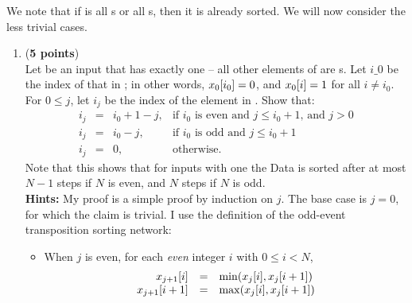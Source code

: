 \documentclass{article}
\newcounter{saveenumii}
\begin{document}
\begin{enumerate}
          We note that if  is all s or all s, then it is already sorted.
          We will now consider the less trivial cases.
          \begin{enumerate}\setcounter{enumii}{\value{saveenumii}}
              \item (\textbf{5 points})\label{q:sort.base}\\
                    Let  be an input that has exactly one  -- all other elements of  are s.
                    Let $i\_0$ be the index of that  in ; in other words, $x_{0}[i_0] = 0$, and
                    $x_{0}[i] = 1$ for all $i \neq i_0$.
                    For $0 \leq j$, let $i_j$ be the index of the  element in .
                    Show that:
                    \begin{displaymath}\begin{array}{rcll}
                            i_j & = & i_0 + 1 - j, & \textrm{if $i_0$ is even and $j \leq i_0 + 1$, and $j > 0$} \\
                            i_j & = & i_0 - j,     & \textrm{if $i_0$ is odd and $j \leq i_0 + 1$}               \\
                            i_j & = & 0,           & \textrm{otherwise.}
                        \end{array}\end{displaymath}
                    Note that this shows that for inputs with one  the Data is sorted after at most
                    $N-1$ steps if $N$ is even, and $N$ steps if $N$ is odd.\\
                    \textbf{Hints:} My proof is a simple proof by induction on $j$.
                    The base case is $j=0$, for which the claim is trivial.
                    I use the definition of the odd-event transposition sorting network:
                    \begin{itemize}
                        \item When $j$ is even, for each \emph{even} integer $i$ with $0 \leq i < N$,
                              \begin{displaymath}\begin{array}{rcl}
                                      x_{j+1}[i]   & = & \min(x_{j}[i], x_{j}[i+1]) \\
                                      x_{j+1}[i+1] & = & \max(x_{j}[i], x_{j}[i+1])
                                  \end{array}\end{displaymath}

\end{itemize}
\end{enumerate}
\end{enumerate}
\end{document}
